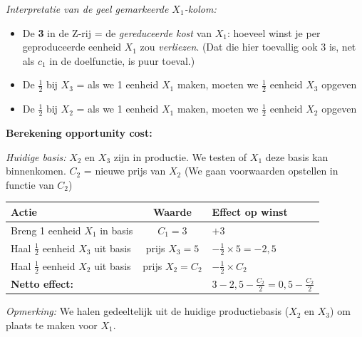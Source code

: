 \documentclass[a4paper,11pt]{article}
\begin{document}
\begin{oefenblok}
    \textit{Interpretatie van de geel gemarkeerde $X_1$-kolom:}
    \begin{itemize}
        \item De \textbf{3} in de Z-rij = de \emph{gereduceerde kost} van $X_1$: hoeveel winst je per
              geproduceerde eenheid $X_1$ zou \emph{verliezen}. (Dat die hier toevallig ook 3 is, net als
              $c_1$ in de doelfunctie, is puur toeval.)
        \item De \textbf{$\frac{1}{2}$} bij $X_3$ = als we 1 eenheid $X_1$ maken, moeten we $\frac{1}{2}$ eenheid $X_3$ opgeven
        \item De \textbf{$\frac{1}{2}$} bij $X_2$ = als we 1 eenheid $X_1$ maken, moeten we $\frac{1}{2}$ eenheid $X_2$ opgeven
    \end{itemize}

    \textbf{Berekening opportunity cost:}

    \textit{Huidige basis:} $X_2$ en $X_3$ zijn in productie. We testen of $X_1$ deze basis kan binnenkomen.
    $C_2$ = nieuwe prijs van $X_2$ (We gaan voorwaarden opstellen in functie van $C_2$)

    \begin{center}
        \begin{tabular}{l|c|l}
            \hline
            \textbf{Actie}                              & \textbf{Waarde}                                 & \textbf{Effect op winst}       \\
            \hline
            Breng 1 eenheid $X_1$ in basis              & $C_1 = 3$                                       & $+3$                           \\
            Haal $\frac{1}{2}$ eenheid $X_3$ uit basis  & prijs $X_3 = 5$                                 & $-\frac{1}{2} \times 5 = -2{,}5$ \\
            Haal $\frac{1}{2}$ eenheid $X_2$ uit basis  & prijs $X_2 = C_2$                               & $-\frac{1}{2} \times C_2$      \\
            \hline
            \multicolumn{2}{l|}{\textbf{Netto effect:}} & $3 - 2{,}5 - \frac{C_2}{2} = 0{,}5 - \frac{C_2}{2}$                                  \\
            \hline
        \end{tabular}
    \end{center}

    \textit{Opmerking:} We halen gedeeltelijk uit de huidige productiebasis ($X_2$ en $X_3$) om plaats te maken voor $X_1$.


\end{oefenblok}
\end{document}
